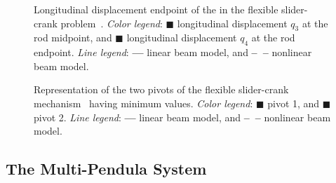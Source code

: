 \begin{figure}[htb]
  \centering
  \small{}
  \caption{Longitudinal displacement endpoint of the in the flexible slider-crank problem~\cite{lioen1998test, mazzia2008test}. \emph{Color legend}: \textcolor{mycolor2}{$\blacksquare$} longitudinal displacement $q_3$ at the rod midpoint, and \textcolor{mycolor1}{$\blacksquare$} longitudinal displacement $q_4$ at the rod endpoint. \emph{Line legend}: \textbf{---} linear beam model, and \textbf{--~--} nonlinear beam model.}
  \label{chap4:fig:flexible_slider_crank}
\end{figure}

\begin{figure}[htb]
  \centering
  \small{}
  \caption{Representation of the two pivots of the flexible slider-crank mechanism~\cite{lioen1998test, mazzia2008test} having minimum values. \emph{Color legend}: \textcolor{mycolor1}{$\blacksquare$} pivot 1, and \textcolor{mycolor2}{$\blacksquare$} pivot 2. \emph{Line legend}: \textbf{---} linear beam model, and \textbf{--~--} nonlinear beam model.}
  \label{chap4:fig:flexible_slider_crank_pivots}
\end{figure}

\subsection{The Multi-Pendula System}

